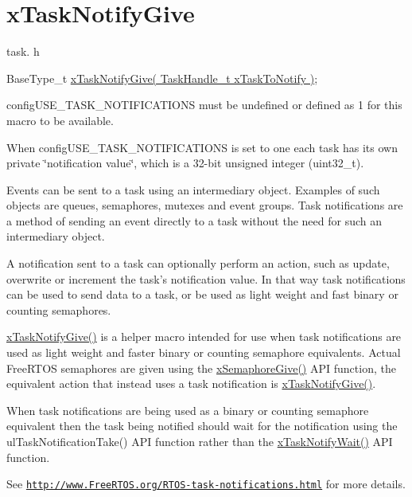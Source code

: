 \hypertarget{group__xTaskNotifyGive}{\section{x\-Task\-Notify\-Give}
\label{group__xTaskNotifyGive}
}
task. h 
\begin{DoxyPre}BaseType\_t \hyperlink{task_8h_ac60cbd05577a3e4f3c3587dd9b213930}{xTaskNotifyGive( TaskHandle\_t xTaskToNotify )};\end{DoxyPre}


config\-U\-S\-E\-\_\-\-T\-A\-S\-K\-\_\-\-N\-O\-T\-I\-F\-I\-C\-A\-T\-I\-O\-N\-S must be undefined or defined as 1 for this macro to be available.

When config\-U\-S\-E\-\_\-\-T\-A\-S\-K\-\_\-\-N\-O\-T\-I\-F\-I\-C\-A\-T\-I\-O\-N\-S is set to one each task has its own private \char`\"{}notification value\char`\"{}, which is a 32-\/bit unsigned integer (uint32\-\_\-t).

Events can be sent to a task using an intermediary object. Examples of such objects are queues, semaphores, mutexes and event groups. Task notifications are a method of sending an event directly to a task without the need for such an intermediary object.

A notification sent to a task can optionally perform an action, such as update, overwrite or increment the task's notification value. In that way task notifications can be used to send data to a task, or be used as light weight and fast binary or counting semaphores.

\hyperlink{task_8h_ac60cbd05577a3e4f3c3587dd9b213930}{x\-Task\-Notify\-Give()} is a helper macro intended for use when task notifications are used as light weight and faster binary or counting semaphore equivalents. Actual Free\-R\-T\-O\-S semaphores are given using the \hyperlink{semphr_8h_aae55761cabfa9bf85c8f4430f78c0953}{x\-Semaphore\-Give()} A\-P\-I function, the equivalent action that instead uses a task notification is \hyperlink{task_8h_ac60cbd05577a3e4f3c3587dd9b213930}{x\-Task\-Notify\-Give()}.

When task notifications are being used as a binary or counting semaphore equivalent then the task being notified should wait for the notification using the ul\-Task\-Notification\-Take() A\-P\-I function rather than the \hyperlink{task_8h_a0475fcda9718f403521c270a7270ff93}{x\-Task\-Notify\-Wait()} A\-P\-I function.

See \href{http://www.FreeRTOS.org/RTOS-task-notifications.html}{\tt http\-://www.\-Free\-R\-T\-O\-S.\-org/\-R\-T\-O\-S-\/task-\/notifications.\-html} for more details.


